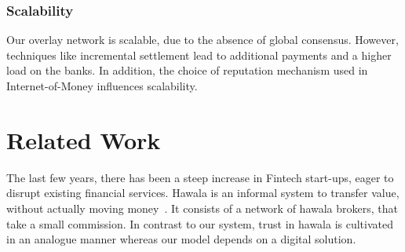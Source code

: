 


\subsubsection*{Scalability}
Our overlay network is scalable, due to the absence of global consensus.
However, techniques like incremental settlement lead to additional payments and a higher load on the banks.
In addition, the choice of reputation mechanism used in Internet-of-Money influences scalability.

\section{Related Work}
The last few years, there has been a steep increase in Fintech start-ups, eager to disrupt existing financial services.
Hawala is an informal system to transfer value, without actually moving money~\cite{jost2003hawala}.
It consists of a network of hawala brokers, that take a small commission.
In contrast to our system, trust in hawala is cultivated in an analogue manner whereas our model depends on a digital solution.

